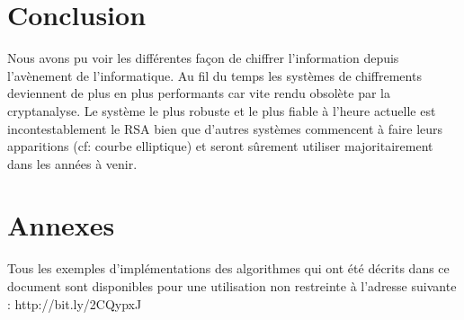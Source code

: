 \chapter*{Conclusion}
Nous avons pu voir les différentes façon de chiffrer l'information depuis l'avènement de l'informatique. Au fil du temps les systèmes de chiffrements deviennent de plus en plus performants car vite rendu obsolète par la cryptanalyse. Le système le plus robuste et le plus fiable à l'heure actuelle est incontestablement le RSA bien que d'autres systèmes commencent à faire leurs apparitions (cf: courbe elliptique) et seront sûrement utiliser majoritairement dans les années à venir.
\chapter*{Annexes}
Tous les exemples d'implémentations des algorithmes qui ont été décrits dans ce document sont disponibles pour une utilisation non restreinte à l'adresse suivante : http://bit.ly/2CQypxJ
